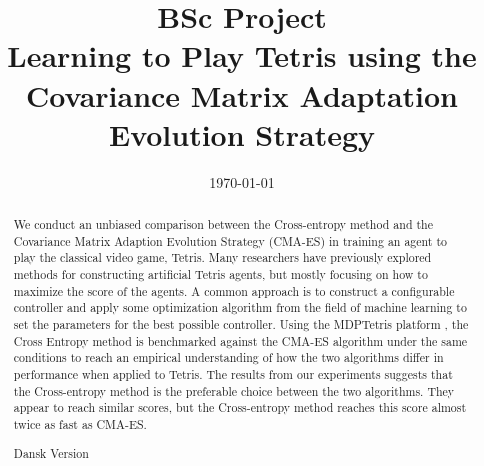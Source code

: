 







\title{BSc Project\\\textbf{Learning to Play Tetris using
    the Covariance Matrix Adaptation
    Evolution Strategy}}
\date{\today}
\maketitle

\tableofcontents

\clearpage

\begin{abstract}
We conduct an unbiased comparison between 
the Cross-entropy method and the Covariance Matrix Adaption
Evolution Strategy (CMA-ES) in training 
an agent to play the classical video game, Tetris. Many researchers have 
previously explored methods for constructing artificial Tetris
agents, but mostly focusing on how to maximize the score of the agents.
A common approach is to construct a configurable controller
and apply some optimization algorithm from the field of machine learning
to set the parameters for the best possible controller. Using the 
MDPTetris platform \citep{mdptetris}, the Cross Entropy
method is benchmarked against the CMA-ES algorithm under the same
conditions to reach an empirical understanding of how the two algorithms
differ in performance when applied to Tetris. The results from our experiments
suggests that the Cross-entropy method is the preferable choice
between the two algorithms. They appear to reach similar scores, 
but the Cross-entropy method reaches this score almost twice as
fast as CMA-ES.
\end{abstract}

\begin{abstract}
Dansk Version
\end{abstract}















\clearpage




\clearpage

\begin{appendices}



\end{appendices}



